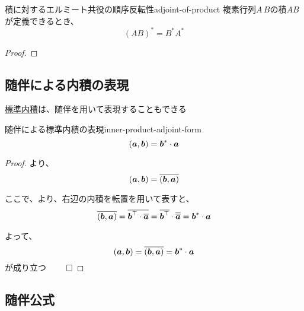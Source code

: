 \documentclass[../../../topic_linear-algebra]{subfiles}
\begin{document}
\br

\begin{theorem}{積に対するエルミート共役の順序反転性}{adjoint-of-product}
  複素行列$A\,B$の積$AB$が定義できるとき、
  \begin{equation*}
    (AB)^* = B^* A^*
  \end{equation*}
\end{theorem}

\begin{proof}
  \todo{}
\end{proof}

\subsection{随伴による内積の表現}

\hyperref[def:standard-inner-product-Cn]{標準内積}は、随伴を用いて表現することもできる

\begin{theorem}{随伴による標準内積の表現}{inner-product-adjoint-form}
  \begin{equation*}
    (\vb*{a},\vb*{b}) = \vb*{b}^* \cdot \vb*{a}
  \end{equation*}
\end{theorem}

\begin{proof}
  より、
  \begin{equation*}
    (\vb*{a},\vb*{b}) = \overline{(\vb*{b},\vb*{a})}
  \end{equation*}

  ここで、より、右辺の内積を転置を用いて表すと、
  \begin{equation*}
    \overline{(\vb*{b},\vb*{a})} = \overline{\vb*{b}^\top \cdot \overline{\vb*{a}}} = \overline{\vb*{b}^\top} \cdot \overline{\overline{\vb*{a}}} = \vb*{b}^* \cdot \vb*{a}
  \end{equation*}

  よって、
  \begin{equation*}
    (\vb*{a},\vb*{b}) = \overline{(\vb*{b},\vb*{a})} = \vb*{b}^* \cdot \vb*{a}
  \end{equation*}
  が成り立つ $\qed$
\end{proof}

\subsection{随伴公式}
\end{document}
